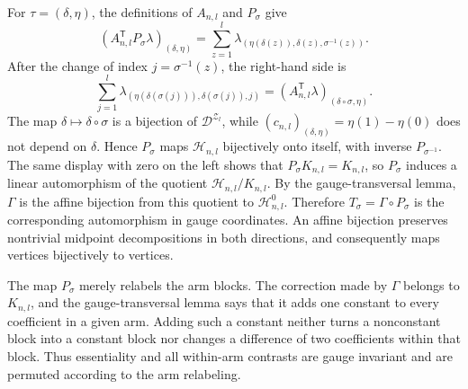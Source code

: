 For \(\tau=(\delta,\eta)\), the definitions of \(A_{n,l}\) and \(P_\sigma\) give
\[(A_{n,l}^{\mathsf T}P_\sigma\lambda)_{(\delta,\eta)}=\sum_{z=1}^l\lambda_{(\eta(\delta(z)),\delta(z),\sigma^{-1}(z))}.\]
After the change of index \(j=\sigma^{-1}(z)\), the right-hand side is
\[\sum_{j=1}^l\lambda_{(\eta(\delta(\sigma(j))),\delta(\sigma(j)),j)}=(A_{n,l}^{\mathsf T}\lambda)_{(\delta\circ\sigma,\eta)}.\]
The map \(\delta\mapsto\delta\circ\sigma\) is a bijection of \(\mathcal D^{\mathcal Z_l}\), while \((c_{n,l})_{(\delta,\eta)}=\eta(1)-\eta(0)\) does not depend on \(\delta\). Hence \(P_\sigma\) maps \(\mathcal H_{n,l}\) bijectively onto itself, with inverse \(P_{\sigma^{-1}}\). The same display with zero on the left shows that \(P_\sigma K_{n,l}=K_{n,l}\), so \(P_\sigma\) induces a linear automorphism of the quotient \(\mathcal H_{n,l}/K_{n,l}\). By the gauge-transversal lemma, \(\Gamma\) is the affine bijection from this quotient to \(\mathcal H^0_{n,l}\). Therefore \(T_\sigma=\Gamma\circ P_\sigma\) is the corresponding automorphism in gauge coordinates. An affine bijection preserves nontrivial midpoint decompositions in both directions, and consequently maps vertices bijectively to vertices.

The map \(P_\sigma\) merely relabels the arm blocks. The correction made by \(\Gamma\) belongs to \(K_{n,l}\), and the gauge-transversal lemma says that it adds one constant to every coefficient in a given arm. Adding such a constant neither turns a nonconstant block into a constant block nor changes a difference of two coefficients within that block. Thus essentiality and all within-arm contrasts are gauge invariant and are permuted according to the arm relabeling.